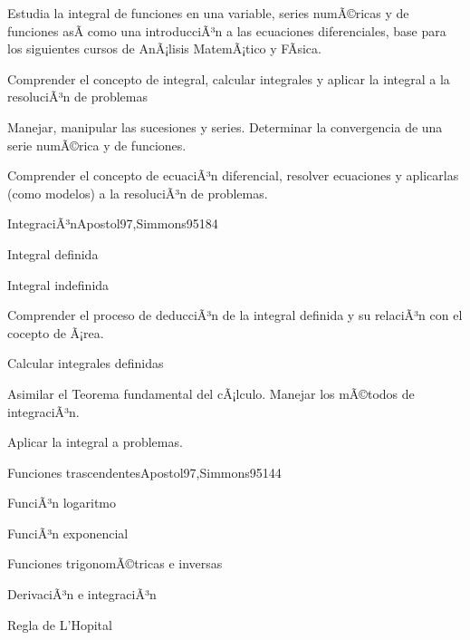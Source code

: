 \begin{syllabus}


\begin{justification}
Estudia la integral de funciones en una variable, series numÃ©ricas y de funciones asÃ­ como una introducciÃ³n a las ecuaciones diferenciales, base para los siguientes cursos de AnÃ¡lisis MatemÃ¡tico y FÃ­sica.
\end{justification}

\begin{goals}
\item Comprender el concepto de integral, calcular integrales y aplicar la integral a la resoluciÃ³n de problemas
\item Manejar, manipular las sucesiones y series. Determinar la convergencia de una serie numÃ©rica y de funciones.
\item Comprender el concepto de ecuaciÃ³n diferencial, resolver ecuaciones y aplicarlas (como modelos) a la resoluciÃ³n de problemas.
\end{goals}

\begin{outcomes}
\end{outcomes}

\begin{unit}{IntegraciÃ³n}{Apostol97,Simmons95}{18}{4}
   \begin{topics}
      \item Integral definida
      \item Integral indefinida
   \end{topics}

   \begin{unitgoals}
      \item Comprender el proceso de deducciÃ³n de la integral definida y su relaciÃ³n con el cocepto de Ã¡rea.
      \item Calcular integrales definidas
      \item Asimilar el Teorema fundamental del cÃ¡lculo. Manejar los mÃ©todos de integraciÃ³n.
      \item Aplicar la integral a problemas.
   \end{unitgoals}
\end{unit}

\begin{unit}{Funciones trascendentes}{Apostol97,Simmons95}{14}{4}
   \begin{topics}
      \item FunciÃ³n logaritmo
      \item FunciÃ³n exponencial
      \item Funciones trigonomÃ©tricas e inversas
      \item DerivaciÃ³n e integraciÃ³n
      \item Regla de L'Hopital
   \end{topics}


\end{unit}
\end{syllabus}
